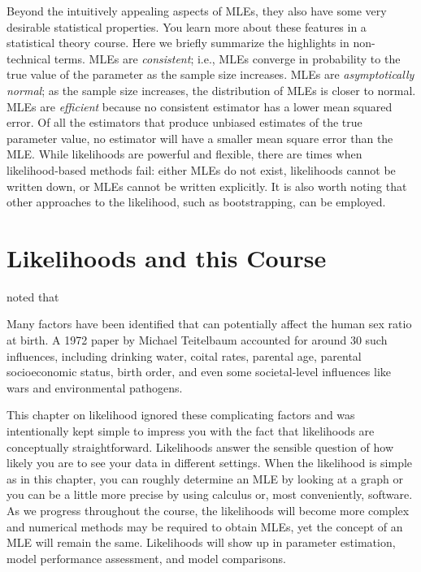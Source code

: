 \documentclass[
]{krantz}
\renewenvironment{quote}{\begin{VF}}{\end{VF}}
\begin{document}
Beyond the intuitively appealing aspects of MLEs, they also have some very desirable statistical properties. You learn more about these features in a statistical theory course. Here we briefly summarize the highlights in non-technical terms. MLEs are \emph{consistent}; i.e., MLEs converge in probability to the true value of the parameter as the sample size increases. MLEs are \emph{asymptotically normal}; as the sample size increases, the distribution of MLEs is closer to normal. MLEs are \emph{efficient} because no consistent estimator has a lower mean squared error. Of all the estimators that produce unbiased estimates of the true parameter value, no estimator will have a smaller mean square error than the MLE. While likelihoods are powerful and flexible, there are times when likelihood-based methods fail: either MLEs do not exist, likelihoods cannot be written down, or MLEs cannot be written explicitly. It is also worth noting that other approaches to the likelihood, such as bootstrapping, can be employed.

\hypertarget{likelihoods-and-this-course}{%
\section{Likelihoods and this Course}\label{likelihoods-and-this-course}}

\citet{Rodgers2001} noted that

\begin{quote}
Many factors have been identified that can potentially affect the human sex
ratio at birth. A 1972 paper by Michael Teitelbaum accounted for around 30
such influences, including drinking water, coital rates, parental age, parental
socioeconomic status, birth order, and even some societal-level influences like
wars and environmental pathogens.
\end{quote}

This chapter on likelihood ignored these complicating factors and was intentionally kept simple to impress you with the fact that likelihoods are conceptually straightforward. Likelihoods answer the sensible question of how likely you are to see your data in different settings. When the likelihood is simple as in this chapter, you can roughly determine an MLE by looking at a graph or you can be a little more precise by using calculus or, most conveniently, software. As we progress throughout the course, the likelihoods will become more complex and numerical methods may be required to obtain MLEs, yet the concept of an MLE will remain the same. Likelihoods will show up in parameter estimation, model performance assessment, and model comparisons.
\end{document}
